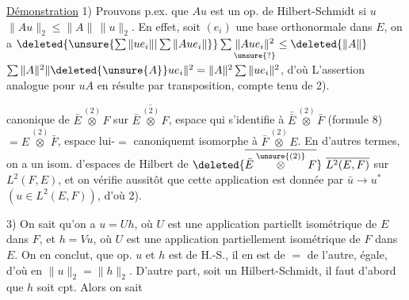 \uline{Démonstration}  1) Prouvons p.ex. que $Au$ est
un op. de Hilbert-Schmidt si $u$  
$\|Au\|_2\leq\|A\|\,\|u\|_2$. En effet, soit $(e_i)$ une base orthonormale
dans $E$, on a $\deleted{\unsure{\sum\|ue_i\||\sum\|Aue_i\|}}\sum\underset{\unsure{?}}{\|Aue_i\|^2}\leq\deleted{\|A\|}$
$\sum\|A\|^2\|\deleted{\unsure{A}}ue_i\|^2=\|A\|^2\sum\|ue_i\|^2$, d'où  
L'assertion analogue pour $uA$ en résulte par transposition,
compte tenu de 2).

 
canonique de $\bar E\overset{(2)}{\otimes}F$ sur $\overline{\bar E\overset{(2)}{\otimes}F}$, espace
qui  s'identifie à $\bar{\bar E}\overset{(2)}{\otimes}\bar F$ (formule 8)
$=E\overset{(2)}{\otimes}\bar F$,  espace lui-$=$ canoniquemt isomorphe
à $\bar F\overset{(2)}{\otimes}E$.  En d'autres termes, on a
un  isom. d'espaces de Hilbert de
$\deleted{\overline{\bar E\overset{\unsure{(2)}}{\otimes}F}}\ \overline{L^2(E,F)}$ sur $L^2(F,E)$, et on vérifie
aussitôt que  cette application est donnée
par $\bar u\to u^*$ $(u\in L^2(E,F))$, d'où 2).

3) On sait qu'on a $u=Uh$, où $U$ est
une application partiellt isométrique de $E$ dans $F$,
et $h=Vu$, où $U$ est une application partiellement
isométrique de $F$ dans $E$. On en conclut,  
  que   op.  $u$
et $h$ est de H.-S., il en est de $=$ de
l'autre,  
égale, d'où en   $\|u\|_2=\|h\|_2$.  D'autre
  
part,  soit un Hilbert-Schmidt, il
faut d'abord que $h$ soit cpt. Alors on sait

